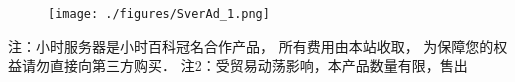 
\begin{issues}
\issueDraft
\end{issues}

\begin{figure}[ht]
\centering
\texttt{[image: ./figures/SverAd\_1.png]}
\label{SverAd_fig1}
\end{figure}

注：小时服务器是小时百科冠名合作产品， 所有费用由本站收取， 为保障您的权益请勿直接向第三方购买．
注2：受贸易动荡影响，本产品数量有限，售出